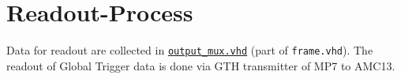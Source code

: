 \section{Readout-Process}

Data for readout are collected in \href{\gitbranch/firmware/hdl/payload/frame/output_mux.vhd}{\texttt{output\_mux.vhd}} (part of \texttt{frame.vhd}).
The readout of Global Trigger data is done via GTH transmitter of MP7 to AMC13.

\clearpage
